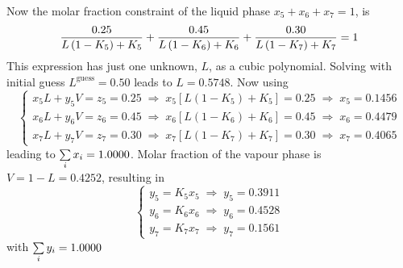 \begin{enumerate}[1)]
   Now the molar fraction constraint of the liquid phase $x_{5}+x_{6}+x_{7} = 1$, is
   \begin{displaymath}
        \frc{0.25}{L\left(1-K_{5}\right)+K_{5}} + \frc{0.45}{L\left(1-K_{6}\right)+K_{6}} + \frc{0.30}{L\left(1-K_{7}\right)+K_{7}} = 1
   \end{displaymath}
   This expression has just one unknown, $L$, as a cubic polynomial. Solving with initial guess $L^{\text{guess}}=0.50$ leads to $L=0.5748$.  Now using 
    \begin{displaymath}
        \begin{cases}
            x_{5}L + y_{5}V = z_{5} = 0.25 \;\Longrightarrow\; x_{5}\left[L\left(1-K_{5}\right)+K_{5}\right] = 0.25  \;\Longrightarrow\;  x_{5} = 0.1456 \\
            x_{6}L + y_{6}V = z_{6} = 0.45 \;\Longrightarrow\; x_{6}\left[L\left(1-K_{6}\right)+K_{6}\right] = 0.45  \;\Longrightarrow\;  x_{6} = 0.4479 \\
            x_{7}L + y_{7}V = z_{7} = 0.30 \;\Longrightarrow\; x_{7}\left[L\left(1-K_{7}\right)+K_{7}\right] = 0.30  \;\Longrightarrow\;  x_{7} = 0.4065 
        \end{cases}
   \end{displaymath}
   leading to $\summation[x_{i}]{i}{} = 1.0000$. Molar fraction of the vapour phase is $V= 1-L=0.4252$, resulting in
    \begin{displaymath}
        \begin{cases}
            y_{5} = K_{5}x_{5} \;\Longrightarrow\; y_{5} = 0.3911 \\
            y_{6} = K_{6}x_{6} \;\Longrightarrow\; y_{6} = 0.4528 \\
            y_{7} = K_{7}x_{7} \;\Longrightarrow\; y_{7} = 0.1561 
        \end{cases}
   \end{displaymath}
    with $\summation[y_{i}]{i}{} = 1.0000$

%
\end{enumerate}
